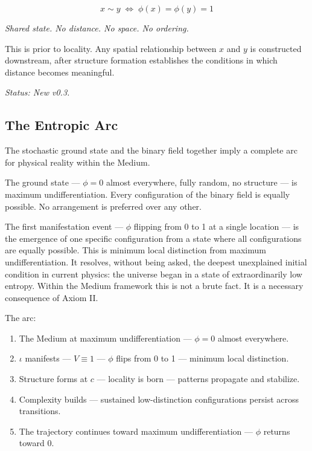 \documentclass[12pt, letterpaper]{article}
\begin{document}
\begin{formulabox}
\begin{equation}
x \sim y \;\iff\; \phi(x) = \phi(y) = 1
\tag{9}
\end{equation}
\centerline{\textit{Shared state. No distance. No space. No ordering.}}
\end{formulabox}

This is prior to locality. Any spatial relationship between \(x\) and \(y\) is
constructed downstream, after structure formation establishes the conditions in
which distance becomes meaningful.

\emph{Status: New v0.3.}
\subsection{The Entropic Arc}
\label{sec:orge58ff7c}

The stochastic ground state and the binary field together imply a complete arc
for physical reality within the Medium.

The ground state --- \(\phi = 0\) almost everywhere, fully random, no structure
--- is maximum undifferentiation. Every configuration of the binary field is
equally possible. No arrangement is preferred over any other.

The first manifestation event --- \(\phi\) flipping from 0 to 1 at a single
location --- is the emergence of one specific configuration from a state where
all configurations are equally possible. This is minimum local distinction from
maximum undifferentiation. It resolves, without being asked, the deepest
unexplained initial condition in current physics: the universe began in a state
of extraordinarily low entropy. Within the Medium framework this is not a brute
fact. It is a necessary consequence of Axiom II.

The arc:

\begin{enumerate}
\item The Medium at maximum undifferentiation --- \(\phi = 0\) almost everywhere.
\item \(\iota\) manifests --- \(V \equiv 1\) --- \(\phi\) flips from 0 to 1 --- minimum local distinction.
\item Structure forms at \(c\) --- locality is born --- patterns propagate and stabilize.
\item Complexity builds --- sustained low-distinction configurations persist across transitions.
\item The trajectory continues toward maximum undifferentiation --- \(\phi\) returns toward 0.
\end{enumerate}
\end{document}
